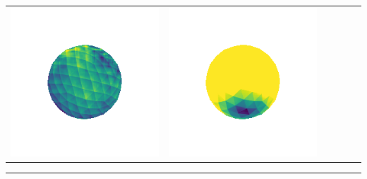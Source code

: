 \begin{center}
\begin{tabularx}{\linewidth}{@{}Y@{}Y@{}Y@{}Y@{}Y@{}Y@{}}
\includegraphics[width=\linewidth]{semisynthetic/20160617_1_marrnet_err.png} &
\includegraphics[width=\linewidth]{semisynthetic/20160617_1_ef_err.png} \\
\end{tabularx}
\begin{center}\rule{0.5\linewidth}{\linethickness}\end{center}


\end{center}
